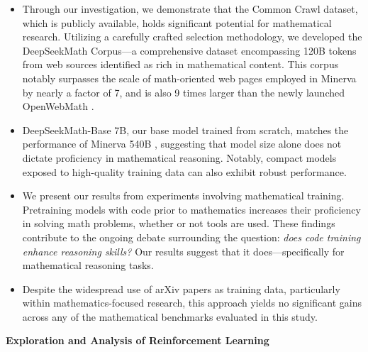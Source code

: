 \begin{itemize}[topsep=0pt]
    \item Through our investigation, we demonstrate that the Common Crawl dataset, which is publicly available, holds significant potential for mathematical research. Utilizing a carefully crafted selection methodology, we developed the DeepSeekMath Corpus—a comprehensive dataset encompassing 120B tokens from web sources identified as rich in mathematical content. This corpus notably surpasses the scale of math-oriented web pages employed in Minerva \citep{minerva} by nearly a factor of 7, and is also 9 times larger than the newly launched OpenWebMath \citep{openwebmath}.

\item DeepSeekMath-Base 7B, our base model trained from scratch, matches the performance of Minerva 540B \citep{minerva}, suggesting that model size alone does not dictate proficiency in mathematical reasoning. Notably, compact models exposed to high-quality training data can also exhibit robust performance.

\item We present our results from experiments involving mathematical training. Pretraining models with code prior to mathematics increases their proficiency in solving math problems, whether or not tools are used. These findings contribute to the ongoing debate surrounding the question: \textit{does code training enhance reasoning skills?} Our results suggest that it does—specifically for mathematical reasoning tasks.

\item Despite the widespread use of arXiv papers as training data, particularly within mathematics-focused research, this approach yields no significant gains across any of the mathematical benchmarks evaluated in this study.
\end{itemize}

\textbf{Exploration and Analysis of Reinforcement Learning}

